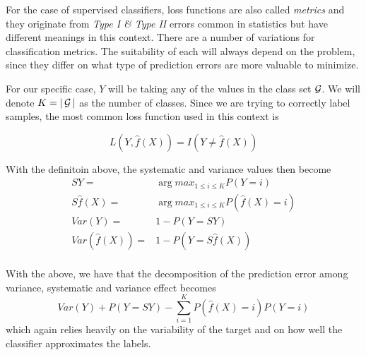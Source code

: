 



For the case of supervised classifiers, loss functions are also called \textit{metrics} and they originate from \textit{Type I \& Type II} errors common in statistics but have different meanings in this context. There are a number of variations for classification metrics. The suitability of each will always depend on the problem, since they differ on what type of prediction errors are more valuable to minimize.

For our specific case, $Y$ will be taking any of the values in the class set $\operatorname{\mathcal{G}}$. We will denote $K = |\operatorname{\mathcal{G}}|$ as the number of classes. Since we are trying to correctly label samples, the most common loss function used in this context is 

\begin{equation}
L(Y, \hat{f}(X)) = I(Y \neq \hat{f}(X))
\end{equation} \label{eq:classificationLossFunction}

With the definitoin above, the systematic and variance values then become 
\begin{equation}
	\begin{split}
	SY = & \arg max_{1\leq i \leq K} P(Y=i) \\
	S\hat{f}(X) = &\arg max_{1\leq i \leq K} P(\hat{f}(X)=i) \\
	Var(Y) = &1 - P(Y=SY) \\
	Var(\hat{f}(X)) =& 1 - P(Y = S\hat{f}(X)) \\
	\end{split}
\end{equation}


With the above, we have that the decomposition of the prediction error among variance, systematic and variance effect becomes
\begin{equation}
Var(Y) + P(Y=SY) - \sum_{i=1}^K P(\hat{f}(X) =i)P(Y=i)	
\end{equation}
	 which again relies heavily on the variability of the target and on how well the classifier approximates the labels.

